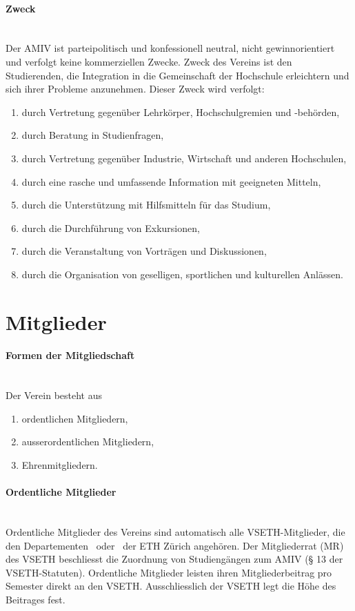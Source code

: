 \documentclass[a4paper,11pt]{article}
\begin{document}
\paragraph{Zweck}\label{Zweck} \ \\
Der AMIV ist parteipolitisch und konfessionell neutral, nicht gewinnorientiert und verfolgt keine kommerziellen Zwecke. Zweck des Vereins ist den Studierenden, die Integration in die Gemeinschaft der Hochschule erleichtern und sich ihrer Probleme anzunehmen.
Dieser Zweck wird verfolgt:
\begin{enumerate}
  \item durch Vertretung gegenüber Lehrkörper, Hochschulgremien und -behörden,\label{HoPo}
  \item durch Beratung in Studienfragen,\label{Beratung}
  \item durch Vertretung gegenüber Industrie, Wirtschaft und anderen Hochschulen,\label{ER}
  \item durch eine rasche und umfassende Information mit geeigneten Mitteln,\label{PR}
  \item durch die Unterstützung mit Hilfsmitteln für das Studium,\label{Fileserver}
  \item durch die Durchführung von Exkursionen,\label{Exkursionen}
  \item durch die Veranstaltung von Vorträgen und Diskussionen,\label{Vortraege}
  \item durch die Organisation von geselligen, sportlichen und kulturellen Anlässen.\label{Kultur}
\end{enumerate}


\section{Mitglieder} 
\paragraph{Formen der Mitgliedschaft} \label{Mitglieder} \ \\
Der Verein besteht aus
\begin{enumerate}
  \item ordentlichen Mitgliedern,
  \item ausserordentlichen Mitgliedern,
  \item Ehrenmitgliedern.
\end{enumerate}


\paragraph{Ordentliche Mitglieder} \ \\
Ordentliche Mitglieder des Vereins sind automatisch alle VSETH-Mitglieder, die den Departementen \MAVT\ oder \ITET\ der ETH Zürich angehören. Der Mitgliederrat (MR) des VSETH beschliesst die Zuordnung von Studiengängen zum AMIV (§ 13 der VSETH-Statuten).
Ordentliche Mitglieder leisten ihren Mitgliederbeitrag pro Semester direkt an den VSETH. Ausschliesslich der VSETH legt die Höhe des Beitrages fest.
\end{document}
